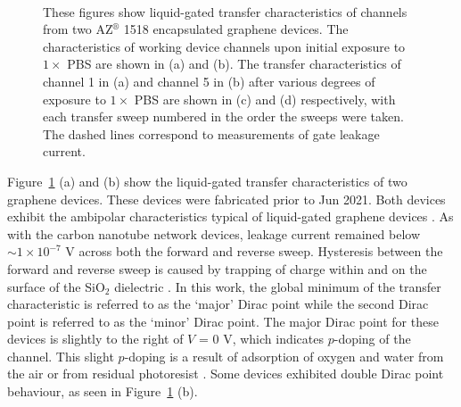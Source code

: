\documentclass[
  a4paper,
]{scrbook}
\begin{document}
\begin{figure}
\begin{minipage}[t]{0.45\linewidth}
{{}

}

\end{minipage}%
%
\begin{minipage}[t]{0.01\linewidth}

{\centering 

~

}

\end{minipage}%

\caption{\label{fig-pristine-graphene}These figures show liquid-gated
transfer characteristics of channels from two AZ\(^\circledR\) 1518
encapsulated graphene devices. The characteristics of working device
channels upon initial exposure to \(1 \times\) PBS are shown in (a) and
(b). The transfer characteristics of channel 1 in (a) and channel 5 in
(b) after various degrees of exposure to \(1 \times\) PBS are shown in
(c) and (d) respectively, with each transfer sweep numbered in the order
the sweeps were taken. The dashed lines correspond to measurements of
gate leakage current.}

\end{figure}

Figure~\ref{fig-pristine-graphene} (a) and (b) show the liquid-gated
transfer characteristics of two graphene devices. These devices were
fabricated prior to Jun 2021. Both devices exhibit the ambipolar
characteristics typical of liquid-gated graphene devices
\autocite{Heller2009a,Heller2010,Xia2010,Kireev2017}. As with the carbon
nanotube network devices, leakage current remained below
\(\sim 1 \times 10^{-7}\) V across both the forward and reverse sweep.
Hysteresis between the forward and reverse sweep is caused by trapping
of charge within and on the surface of the SiO\(_{2}\) dielectric
\autocite{Bartolomeo2011}. In this work, the global minimum of the
transfer characteristic is referred to as the `major' Dirac point while
the second Dirac point is referred to as the `minor' Dirac point. The
major Dirac point for these devices is slightly to the right of \(V\) =
0 V, which indicates \(p\)-doping of the channel. This slight
\(p\)-doping is a result of adsorption of oxygen and water from the air
or from residual photoresist \autocite{Cheng2011,Shin2012,Kireev2017}.
Some devices exhibited double Dirac point behaviour, as seen in
Figure~\ref{fig-pristine-graphene} (b).
\end{document}
